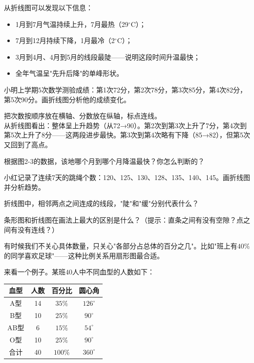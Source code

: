 从折线图可以发现以下信息：
\begin{itemize}
\item 1月到7月气温持续上升，7月最热（29$^\circ$C）；
\item 7月到12月持续下降，1月最冷（2$^\circ$C）；
\item 3月到4月、4月到5月的线段最陡——说明这段时间升温最快；
\item 全年气温呈"先升后降"的单峰形状。
\end{itemize}


\begin{example}
小明上学期$5$次数学测验成绩：第1次72分，第2次78分，第3次85分，第4次82分，第5次90分。画折线图分析他的成绩变化。
\end{example}
\begin{solution}
把次数按顺序放在横轴、分数放在纵轴，标点连线。\\
从折线图看出：整体呈上升趋势（从72→90）。第2次到第3次上升了7分，第4次到第5次上升了8分——这两段进步最快。第3次到第4次略有下降（85→82），但第5次又回到了高点。
\end{solution}

\begin{exercise}
\item 根据图2-3的数据，该地哪个月到哪个月降温最快？你怎么判断的？
\item 小红记录了连续7天的跳绳个数：120、125、130、128、135、140、145。画折线图并分析趋势。
\item 折线图中，相邻两点之间连成的线段，"陡"和"缓"分别代表什么？
\item 条形图和折线图在画法上最大的区别是什么？（提示：直条之间有没有空隙？点之间有没有连线？）
\end{exercise}


有时候我们不关心具体数量，只关心"各部分占总体的百分之几"。比如"班上有$40\%$的同学喜欢足球"——这种比例关系用扇形图最合适。

来看一个例子。某班$40$人中不同血型的人数如下：

\begin{center}
\begin{tabular}{c|c|c|c}
血型 & 人数 & 百分比 & 圆心角\\\hline
A型 & 14 & $35\%$ & $126^\circ$\\
B型 & 10 & $25\%$ & $90^\circ$\\
AB型 & 6 & $15\%$ & $54^\circ$\\
O型 & 10 & $25\%$ & $90^\circ$\\
合计 & 40 & $100\%$ & $360^\circ$
\end{tabular}
\end{center}


